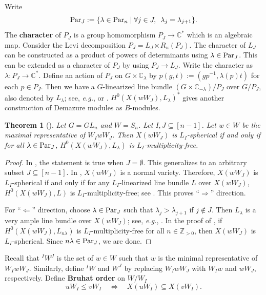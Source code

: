 \documentclass[12pt]{amsart}
\newtheorem{theorem}{Theorem}[section]
\theoremstyle{definition}
\theoremstyle{remark}
\newcommand{\C}{\mathbb{C}}
\newcommand{\Z}{\mathbb{Z}}
\newcommand{\Parn}{{\rm Par}_n}
\newcommand{\Parj}{{\rm Par}_J}
\begin{document}
Write
\begin{equation}\label{eqn2.2}
\Parj := \{ \lambda \in \Parn \mid \forall j \in J, \hspace{0.5em} \lambda_j = \lambda_{j+1}\}.
\end{equation}
The \textbf{character} of $P_J$ is a group homomorphism $P_J \rightarrow \C^*$ which is an algebraic map. Consider the Levi decomposition $P_J = L_J \ltimes R_u(P_J)$. The character of $L_J$ can be constructed as a product of powers of determinants using $\lambda \in \Parj$. This can be extended as a character of $P_J$ by using $P_J \rightarrow L_J$. Write the character as $\lambda : P_J \rightarrow \C^*$. Define an action of $P_J$ on $G \times \C_\lambda$ by $p(g,t) := (g p^{-1} , \lambda(p)t)$ for each $p \in P_J$. Then we have a $G$-linearized line bundle $(G \times \C_{-\lambda})/P_J$ over $G/P_J$, also denoted by $L_\lambda$; see, \textit{e.g.}, \cite{MR1782635} or \cite{MR2015057}. $H^0(X(wW_J),L_\lambda)^*$ gives another construction of Demazure modules as $B$-modules. 

\begin{theorem}[{\cite[Theorem 4.13]{MR4394321}}]\label{lem2.4}
Let $G= GL_n$ and $W= S_n$. Let $I, J \subseteq [n-1]$. Let $w \in W$ be the maximal representative of $W_I w W_J$. Then $X(wW_J)$ is $L_I$-spherical if and only if for all $\lambda \in \Parj$, $H^0(X(wW_J),L_\lambda)$ is $L_I$-multiplicity-free.
\end{theorem}
\begin{proof}
In \cite[Theorem~4.13]{MR4394321}, the statement is true when $J=\emptyset$. This generalizes to an arbitrary subset $J \subseteq [n-1]$. In \cite{MR0630769}, $X(wW_J)$ is a normal variety. Therefore, $X(wW_J)$ is $L_I$-spherical if and only if for any $L_I$-linearized line bundle $L$ over $X(wW_J)$, $H^0(X(wW_J),L)$ is $L_I$-multiplicity-free; see \cite[Theorem~2.1.2]{MR3177371}. This proves ``$\Rightarrow$'' direction. 

For ``$\Leftarrow$'' direction, choose $\lambda \in \Parj$ such that $\lambda_j > \lambda_{j+1}$ if $j \notin J$. Then $L_\lambda$ is a very ample line bundle over $X(wW_J)$; see, \textit{e.g.}, \cite[II \S 8]{MR2015057}. In the proof of \cite[Theorem~2.1.2]{MR3177371}, if $H^0(X(wW_J) , L_{n \lambda} )$ is $L_I$-multiplicity-free for all $n \in \Z_{>0}$, then $X(wW_J)$ is $L_I$-spherical. Since $n \lambda \in \Parj$, we are done.
\end{proof}

Recall that ${}^I W^J$ is the set of $w \in W$ such that $w$ is the minimal representative of $W_I w W_J$. Similarly, define ${}^I W$ and $W^J$ by replacing $W_I w W_J$ with $W_I w$ and $wW_J$, respectively. Define \textbf{Bruhat order} on $W/W_I$
\begin{equation}\label{eqn2.3}
uW_I \leq vW_I \quad \Leftrightarrow \quad X(uW_I) \subseteq X(vW_I).
\end{equation}
\end{document}
